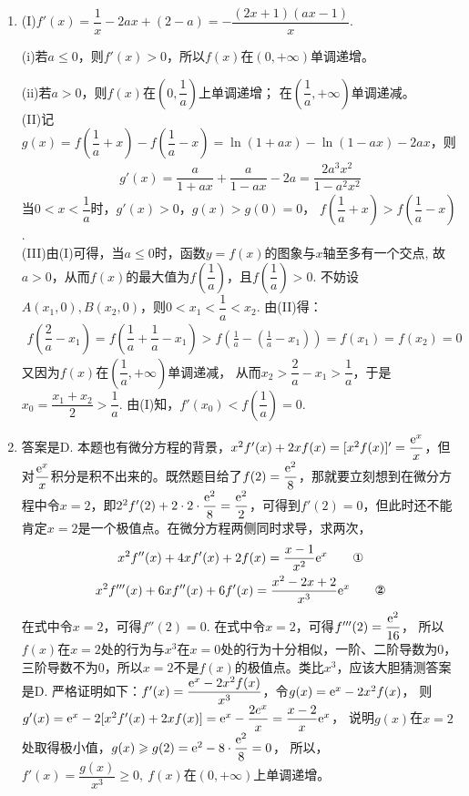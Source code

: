 \begin{enumerate}[label={\textbf{\thechapter.\arabic*}},leftmargin=
    \inteval{\myenumleftmargin}pt]
\item (I)$ f'(x)=\dfrac{1}{x}-2ax+(2-a)=-\dfrac{(2x+1)(ax-1)}{x} $. 

(i)若$a\leqslant 0$，则$f'(x)>0$，所以$f(x)$在$(0,+\infty)$单调递增。

(ii)若$a>0$，则$ f(x) $在$ \left(0,\dfrac{1}{a}\right) $上单调递增；
在$\left(\dfrac{1}{a},+\infty\right)$单调递减。\\
(II)记$g(x)=f\left(\dfrac{1}{a}+x\right)-f\left(\dfrac{1}{a}-x\right)
=\ln(1+ax)-\ln(1-ax)-2ax $，则
\begin{gather*}
    g'(x)=\dfrac{a}{1+ax}+\dfrac{a}{1-ax}-2a=\dfrac{2a^{3}x^{2}}{1-a^{2}x^{2}}
\end{gather*}
当$0<x<\dfrac{1}{a}$时，$g'(x)>0$，$ g(x)>g(0)=0 $，
$f\left(\dfrac{1}{a}+x\right)>f\left(\dfrac{1}{a}-x\right)$.\\
(III)由(I)可得，当$a\leqslant0$时，函数$y=f(x)$的图象与$x$轴至多有一个交点,
故$a>0$，从而$f(x)$的最大值为$f\left(\dfrac{1}{a}\right)$，且$f\left(\dfrac{1}{a}\right)>0$.
不妨设$A\left(x_{1},0\right),B\left(x_{2},0\right)$，则$0<x_{1}<\dfrac{1}{a}<x_{2}$.
由(II)得：
\begin{gather*}
    f\left(\dfrac{2}{a}-x_{1}\right)=f\left(\dfrac{1}{a}+\dfrac{1}{a}-x_{1}\right)
    >f\left(\frac{1}{a}-\left(\frac{1}{a}-x_{1}\right)\right)=
    f\left(x_{1}\right)=f\left(x_{2}\right)=0
\end{gather*}
又因为$f(x)$在$\left(\dfrac{1}{a},+\infty\right)$单调递减，
从而$x_{2}>\dfrac{2}{a}-x_{1}>\dfrac{1}{a} $，于是$x_{0}=\dfrac{x_{1}+x_{2}}{2}>\dfrac{1}{a}$.
由(I)知，$f'\left(x_{0}\right)<f\left(\dfrac{1}{a}\right)=0 $.

\item  
答案是D. 本题也有微分方程的背景，$ x^2f'(x)+2xf(x)=[x^2f(x)]'=\dfrac{\mathrm{e}^x}{x} $，但对$ \dfrac{\mathrm{e}^x}{x} $积分是积不出来的。既然题目给了$ f(2)=\dfrac{\mathrm{e}^2}{8} $，那就要立刻想到在微分方程中令$ x=2 $，即$ 2^2f'(2)+2\cdot 2\cdot \dfrac{\mathrm{e}^2}{8}=\dfrac{\mathrm{e}^2}{2} $，可得到$ f'(2)=0 $，但此时还不能肯定$ x=2 $是一个极值点。在微分方程两侧同时求导，求两次，
\begin{gather}
    x^2f''(x)+4xf'(x)+2f(x)=\dfrac{x-1}{x^2}\e^x \tag*{\ding{172}} \\
    x^2f'''(x)+6xf''(x)+6f'(x)=\dfrac{x^2-2x+2}{x^3}\e^x  
    \tag*{\ding{173}}
\end{gather}
在式中令$ x=2 $，可得$ f''(2)=0 $. 
在式中令$ x=2 $，可得$ f'''(2)=\dfrac{\mathrm{e}^2}{16} $，
所以$ f(x) $在$ x=2 $处的行为与$ x^3 $在$ x=0 $处的行为十分相似，一阶、二阶导数为0，
三阶导数不为0，所以$ x=2 $不是$ f(x) $的极值点。类比$ x^3 $，应该大胆猜测答案是D.
严格证明如下：$ f'(x)=\dfrac{\mathrm{e}^x-2x^2f(x)}{x^3} $，令$ g(x)=\mathrm{e}^x-2x^2f(x) $，
则$ g'(x)=\mathrm{e}^x-2[x^2f'(x)+2xf(x)]=\mathrm{e}^x-\dfrac{2e^x}{x}=\dfrac{x-2}{x}\mathrm{e}^x $，
说明$ g(x) $在$ x=2 $处取得极小值，$ g(x)\geqslant g(2)=\mathrm{e}^2-8\cdot \dfrac{\mathrm{e}^2}{8}=0 $，
所以，$ f'(x)=\dfrac{g(x)}{x^3}\geq 0,\ f(x) $在$ (0,+\infty) $上单调递增。


\end{enumerate}
